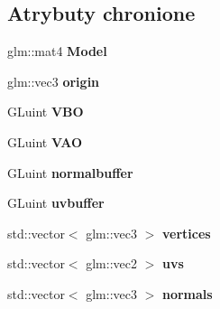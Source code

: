 \subsection*{Atrybuty chronione}
\begin{DoxyCompactItemize}
\item 
\hypertarget{class_swift_1_1_object_a8f8676d34bb644d23f18b940d11c1086}{glm\-::mat4 {\bfseries Model}}\label{class_swift_1_1_object_a8f8676d34bb644d23f18b940d11c1086}

\item 
\hypertarget{class_swift_1_1_object_a35139111d8e8e784f311d8cca95d68c4}{glm\-::vec3 {\bfseries origin}}\label{class_swift_1_1_object_a35139111d8e8e784f311d8cca95d68c4}

\item 
\hypertarget{class_swift_1_1_object_a6c801de7abc9b6bb694d958fe0876543}{G\-Luint {\bfseries V\-B\-O}}\label{class_swift_1_1_object_a6c801de7abc9b6bb694d958fe0876543}

\item 
\hypertarget{class_swift_1_1_object_a3fae7f32130c46c2b76aefae3c6aa1e7}{G\-Luint {\bfseries V\-A\-O}}\label{class_swift_1_1_object_a3fae7f32130c46c2b76aefae3c6aa1e7}

\item 
\hypertarget{class_swift_1_1_object_a5029da6cf367b9e34c62daa45a4a56c2}{G\-Luint {\bfseries normalbuffer}}\label{class_swift_1_1_object_a5029da6cf367b9e34c62daa45a4a56c2}

\item 
\hypertarget{class_swift_1_1_object_a2373549381ac70c984cedbf40b06d85c}{G\-Luint {\bfseries uvbuffer}}\label{class_swift_1_1_object_a2373549381ac70c984cedbf40b06d85c}

\item 
\hypertarget{class_swift_1_1_object_a8a1161446d212565e63daa50f472da0f}{std\-::vector$<$ glm\-::vec3 $>$ {\bfseries vertices}}\label{class_swift_1_1_object_a8a1161446d212565e63daa50f472da0f}

\item 
\hypertarget{class_swift_1_1_object_a8bc1f0d82ee32b85a3164eb8d3282cb5}{std\-::vector$<$ glm\-::vec2 $>$ {\bfseries uvs}}\label{class_swift_1_1_object_a8bc1f0d82ee32b85a3164eb8d3282cb5}

\item 
\hypertarget{class_swift_1_1_object_a6448734d9a42316c0f7c57b859856eff}{std\-::vector$<$ glm\-::vec3 $>$ {\bfseries normals}}\label{class_swift_1_1_object_a6448734d9a42316c0f7c57b859856eff}


\end{DoxyCompactItemize}
